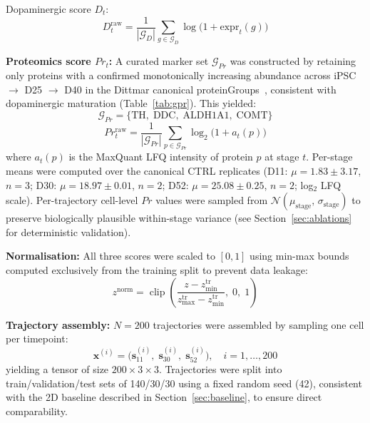\documentclass[5p,times,twocolumn]{elsarticle}
\begin{document}
Dopaminergic score $D_{t}$:
%
\begin{equation}
  D_{t}^{\text{raw}} =
    \frac{1}{|\mathcal{G}_{D}|}
    \sum_{g \in \mathcal{G}_{D}} \log\!\bigl(1 + \text{expr}_{t}(g)\bigr)
  \label{eq:D}
\end{equation}

\textbf{Proteomics score $Pr_{t}$:}
A curated marker set $\mathcal{G}_{Pr}$ was constructed by
retaining only proteins with a confirmed monotonically
increasing abundance across iPSC $\to$ D25 $\to$ D40 in
the Dittmar canonical proteinGroups~\cite{novak2022single}, consistent with
dopaminergic maturation (Table~\ref{tab:gpr}).
This yielded:
%
\begin{equation}
  \mathcal{G}_{Pr} =
    \{\text{TH},\;\text{DDC},\;\text{ALDH1A1},\;\text{COMT}\}
  \label{eq:gpr}
\end{equation}
%
\begin{equation}
  Pr_{t}^{\text{raw}} =
    \frac{1}{|\mathcal{G}_{Pr}|}
    \sum_{p \in \mathcal{G}_{Pr}} \log_{2}\!\bigl(1 + a_{t}(p)\bigr)
  \label{eq:Pr}
\end{equation}
%
where $a_{t}(p)$ is the MaxQuant LFQ intensity of protein $p$
at stage $t$.
Per-stage means were computed over the canonical CTRL
replicates (D11: $\mu = 1.83 \pm 3.17$, $n = 3$;
D30: $\mu = 18.97 \pm 0.01$, $n = 2$;
D52: $\mu = 25.08 \pm 0.25$, $n = 2$; log$_{2}$ LFQ scale).
Per-trajectory cell-level $Pr$ values were sampled from
$\mathcal{N}(\mu_{\text{stage}},\,\sigma_{\text{stage}})$
to preserve biologically plausible within-stage variance
(see Section~\ref{sec:ablations} for deterministic
validation).

\textbf{Normalisation:}
All three scores were scaled to $[0,1]$ using min-max bounds
computed exclusively from the training split to prevent
data leakage:
%
\begin{equation}
  z^{\text{norm}} =
    \operatorname{clip}\!\left(
      \frac{z - z^{\text{tr}}_{\min}}
           {z^{\text{tr}}_{\max} - z^{\text{tr}}_{\min}},\;
      0,\; 1
    \right)
  \label{eq:norm}
\end{equation}

\textbf{Trajectory assembly:}
$N = 200$ trajectories were assembled by sampling one cell
per timepoint:
%
\begin{equation}
  \mathbf{x}^{(i)} =
    \bigl(\mathbf{s}^{(i)}_{11},\;
           \mathbf{s}^{(i)}_{30},\;
           \mathbf{s}^{(i)}_{52}\bigr),
  \quad i = 1,\ldots,200
  \label{eq:traj}
\end{equation}
%
yielding a tensor of size $200 \times 3 \times 3$.
Trajectories were split into train/validation/test sets
of 140/30/30 using a fixed random seed (42), consistent
with the 2D baseline described in
Section~\ref{sec:baseline}, to ensure direct comparability.
\end{document}
